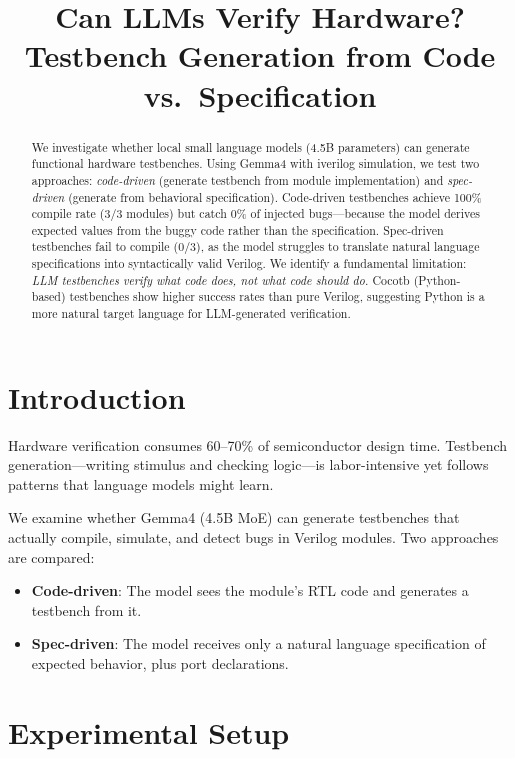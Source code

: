\documentclass[conference]{IEEEtran}
\title{Can LLMs Verify Hardware?\\Testbench Generation from Code vs.\ Specification}
\author{
\IEEEauthorblockN{William Chen}
\IEEEauthorblockA{National Taiwan University}
}
\begin{document}
\maketitle

\begin{abstract}
We investigate whether local small language models (4.5B parameters)
can generate functional hardware testbenches. Using Gemma4 with
iverilog simulation, we test two approaches: \emph{code-driven}
(generate testbench from module implementation) and \emph{spec-driven}
(generate from behavioral specification). Code-driven testbenches
achieve 100\% compile rate (3/3 modules) but catch 0\% of injected
bugs---because the model derives expected values from the buggy code
rather than the specification. Spec-driven testbenches fail to compile
(0/3), as the model struggles to translate natural language
specifications into syntactically valid Verilog. We identify a
fundamental limitation: \emph{LLM testbenches verify what code does,
not what code should do.} Cocotb (Python-based) testbenches show
higher success rates than pure Verilog, suggesting Python is a more
natural target language for LLM-generated verification.
\end{abstract}

\section{Introduction}

Hardware verification consumes 60--70\% of semiconductor design time.
Testbench generation---writing stimulus and checking logic---is
labor-intensive yet follows patterns that language models might learn.

We examine whether Gemma4 (4.5B MoE) can generate testbenches that
actually compile, simulate, and detect bugs in Verilog modules.
Two approaches are compared:

\begin{itemize}
    \item \textbf{Code-driven}: The model sees the module's RTL code
    and generates a testbench from it.
    \item \textbf{Spec-driven}: The model receives only a natural
    language specification of expected behavior, plus port declarations.
\end{itemize}

\section{Experimental Setup}
\end{document}
